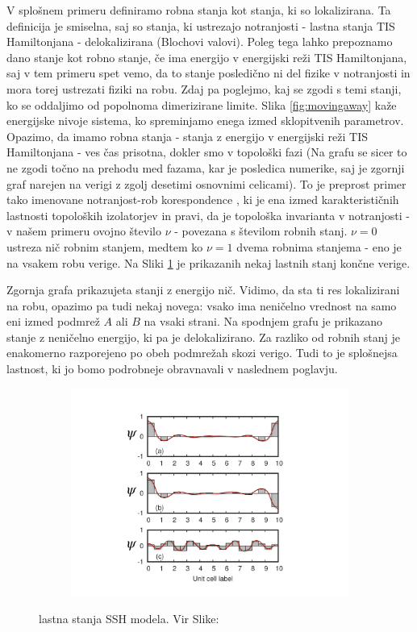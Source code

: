 V splošnem primeru definiramo robna stanja kot stanja, ki so lokalizirana. Ta definicija je smiselna, saj so stanja, ki ustrezajo notranjosti - lastna stanja TIS Hamiltonjana - delokalizirana (Blochovi valovi). Poleg tega lahko prepoznamo dano stanje kot robno stanje, če ima energijo v energijski reži TIS Hamiltonjana, saj v tem primeru spet vemo, da to stanje posledično ni del fizike v notranjosti in mora torej ustrezati fiziki na robu.
Zdaj pa poglejmo, kaj se zgodi s temi stanji, ko se oddaljimo od popolnoma dimerizirane limite. Slika \ref{fig:movingaway} kaže energijske nivoje sistema, ko spreminjamo enega izmed sklopitvenih parametrov. Opazimo, da imamo robna stanja - stanja z energijo v energijski reži TIS Hamiltonjana - ves čas prisotna, dokler smo v topološki fazi (Na grafu se sicer to ne zgodi točno na prehodu med fazama, kar je posledica numerike, saj je zgornji graf narejen na verigi z zgolj desetimi osnovnimi celicami). To je preprost primer tako imenovane notranjost-rob korespondence \cite{proof}, ki je ena izmed karakterističnih lastnosti topoloških izolatorjev in pravi, da je topološka invarianta v notranjosti - v našem primeru ovojno število $\nu$ - povezana s številom robnih stanj. $\nu = 0$ ustreza nič robnim stanjem, medtem ko $\nu = 1$ dvema robnima stanjema - eno je na vsakem robu verige.
Na Sliki \ref{fig:plots} je prikazanih nekaj lastnih stanj končne verige. 
\begin{multicols}{2}
Zgornja grafa prikazujeta stanji z energijo nič. Vidimo, da sta ti res lokalizirani na robu, opazimo pa tudi nekaj novega: vsako ima neničelno vrednost na samo eni izmed podmrež $A$ ali $B$ na vsaki strani. Na spodnjem grafu je prikazano stanje z neničelno energijo, ki pa je delokalizirano. Za razliko od robnih stanj je enakomerno razporejeno po obeh podmrežah skozi verigo. Tudi to je splošnejsa lastnost, ki jo bomo podrobneje obravnavali v naslednem poglavju.
\columnbreak
\begin{figure}[H]
\centering
\begin{subfigure}{.48\textwidth}
\includegraphics[width=\linewidth]{Figures/wave.pdf}
\end{subfigure}
\caption{lastna stanja SSH modela. Vir Slike: \cite{arxiv}}
\label{fig:plots}
\end{figure}
\end{multicols}
